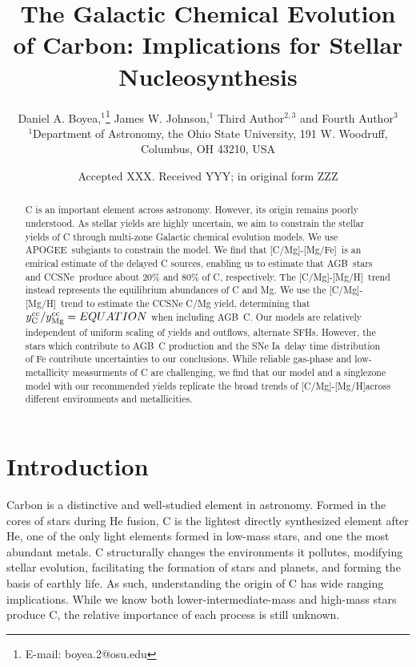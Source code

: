 \documentclass[fleqn,usenatbib]{mnras}
\title[The Origin and Galactic Evolution of Carbon]{The Galactic Chemical Evolution of Carbon: Implications for Stellar Nucleosynthesis }
\author[D. A. Boyea et. al.]{
Daniel A. Boyea,$^{1}$\thanks{E-mail: boyea.2@osu.edu}
James W. Johnson,$^{1}$
Third Author$^{2,3}$
and Fourth Author$^{3}$
\\
$^{1}$Department of Astronomy, the Ohio State University, 191 W. Woodruff, Columbus, OH 43210, USA
}
\date{Accepted XXX. Received YYY; in original form ZZZ}
\newcommand{\agb}{AGB}
\newcommand{\apogee}{APOGEE}
\newcommand{\cc}{CCSNe}
\newcommand{\ia}{SNe Ia}
\newcommand{\sfh}{SFH}
\newcommand{\caah}{[C/Mg]-[Mg/H]}
\newcommand{\caafe}{[C/Mg]-[Mg/Fe]}
\newcommand{\Ycc}{\ensuremath{y_{\rm C}^{\rm cc}}}
\newcommand{\Yoc}{\ensuremath{y_{\rm Mg}^{\rm cc}}}
\begin{document}
\label{firstpage}
\pagerange{\pageref{firstpage}--\pageref{lastpage}}
\maketitle



\begin{abstract}
C is an important element across astronomy. However, its origin remains poorly understood. 
% 
As stellar yields are highly uncertain, we aim to constrain the stellar yields of C through multi-zone Galactic chemical evolution models. 
We use \apogee\ subgiants to constrain the model. 
% 
We find that \caafe\ is an emirical estimate of the delayed C sources, enabling us to estimate that \agb\ stars and \cc\ produce about 20\% and 80\% of C, respectively.  
The \caah\ trend instead represents the equilibrium abundances of C and Mg. 
We use the \caah\ trend to estimate the CCSNe C/Mg yield, determining that  $\Ycc/\Yoc = EQUATION$ when including \agb\ C. 
Our models are relatively independent of uniform scaling of yields and outflows, alternate \sfh{}s. 
However, the stars which contribute to \agb\ C production and the \ia\ delay time distribution of Fe contribute uncertainties to our conclusions. 
While reliable gas-phase and low-metallicity measurments of C are challenging, we find that our model and a singlezone model with our recommended yields replicate the broad trends of \caah across different environments and metallicities. 

\end{abstract}







\section{Introduction}

Carbon is a distinctive and well-studied element in astronomy. 
Formed in the cores of stars during He fusion, C is the lightest directly synthesized element after He, one of the only light elements formed in low-mass stars, and one the most abundant metals\footnotemark{}. %
C structurally changes the environments it pollutes, modifying stellar evolution, facilitating the formation of stars and planets, and forming the basis of earthly life.
As such, understanding the origin of C has wide ranging implications. 
While we know both lower-intermediate-mass and high-mass stars produce C, the relative importance of each process is still unknown.
\end{document}
